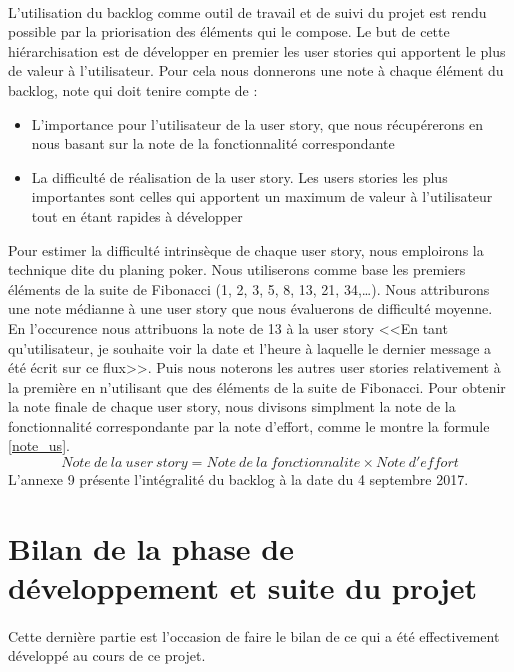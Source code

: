 			\paragraph{}%
			L'utilisation du backlog comme outil de travail et de suivi du projet est
			rendu possible par la priorisation des éléments qui le compose. Le but de
			cette hiérarchisation est de développer en premier les user stories qui
			apportent le plus de valeur à l'utilisateur. Pour cela nous donnerons
			une note à chaque élément du backlog, note qui doit tenire compte de :
			\begin{itemize}
			  \item L'importance pour l'utilisateur de la user story, que nous
			  récupérerons en nous basant sur la note de la fonctionnalité correspondante
			  \item La difficulté de réalisation de la user story. Les users stories les
			  plus importantes sont celles qui apportent un maximum de valeur à
			  l'utilisateur tout en étant rapides à développer
			\end{itemize}
			Pour estimer la difficulté intrinsèque de chaque user story,
			nous emploirons la technique dite du planing poker. Nous utiliserons comme
			base les premiers éléments de la suite de Fibonacci (1, 2, 3, 5, 8, 13, 21,
			34,\ldots). Nous attriburons une note médianne à une user story que nous
			évaluerons de difficulté moyenne. En l'occurence nous attribuons la note de
			13 à la user story <<En tant qu'utilisateur, je souhaite voir la date et
			l'heure à laquelle le dernier message a été écrit sur ce flux>>. 
			Puis nous noterons les autres user stories relativement à la première en
			n'utilisant que des éléments de la suite de Fibonacci.\newline
			Pour obtenir la note finale de chaque user story, nous divisons simplment la
			note de la fonctionnalité correspondante par la note d'effort, comme le
			montre la formule \ref{note_us}.
			\begin{equation}
				\label{note_us}
				Note\ de\ la\ user\ story=Note\ de\ la\ fonctionnalite \times Note\ d'effort
			\end{equation}
			L'annexe 9 présente l'intégralité du backlog à la date du 4 septembre 2017.
	
	\section{Bilan de la phase de développement et suite du projet}
		\paragraph{}
		Cette dernière partie est l'occasion de faire le bilan de ce qui a été
		effectivement développé au cours de ce projet.
		
